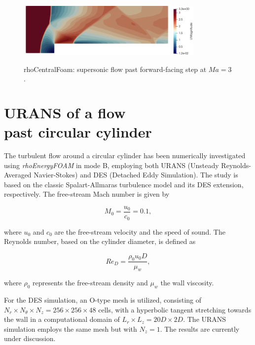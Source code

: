 \documentclass[a5paper]{sapthesis}
\begin{document}
	\begin{figure}
		\centering
		\subfloat
		{\includegraphics[width=0.7\textwidth]{Figures/FS_rcf}} \quad 
		\subfloat
		\centering
		{\includegraphics[width=0.1\textwidth, height=0.16\textheight]{Figures/FS_velocitybar}}
		\caption{rhoCentralFoam: supersonic ﬂow past forward-facing step at $Ma = 3$.}
		\label{FS_rcf}
	\end{figure}
	
	\section{URANS of a flow \\ past circular cylinder}
	The turbulent flow around a circular cylinder has been numerically investigated using \textit{rhoEnergyFOAM} in mode B, employing both URANS (Unsteady Reynolds-Averaged Navier-Stokes) and DES (Detached Eddy Simulation). The study is based on the classic Spalart-Allmaras turbulence model and its DES extension, respectively. The free-stream Mach number is given by 
	
	\begin{equation}
		M_0 = \frac{u_0}{c_0} = 0.1,
	\end{equation}
	
	where \( u_0 \) and \( c_0 \) are the free-stream velocity and the speed of sound. The Reynolds number, based on the cylinder diameter, is defined as
	
	\begin{equation}
		Re_D = \frac{\rho_0 u_0 D}{\mu_w},
	\end{equation}
	
	where \( \rho_0 \) represents the free-stream density and \( \mu_w \) the wall viscosity.  
	
	For the DES simulation, an O-type mesh is utilized, consisting of \( N_r \times N_\theta \times N_z = 256 \times 256 \times 48 \) cells, with a hyperbolic tangent stretching towards the wall in a computational domain of \( L_r \times L_z = 20D \times 2D \). The URANS simulation employs the same mesh but with \( N_z = 1 \). The results are currently under discussion.  
	
\end{document}
